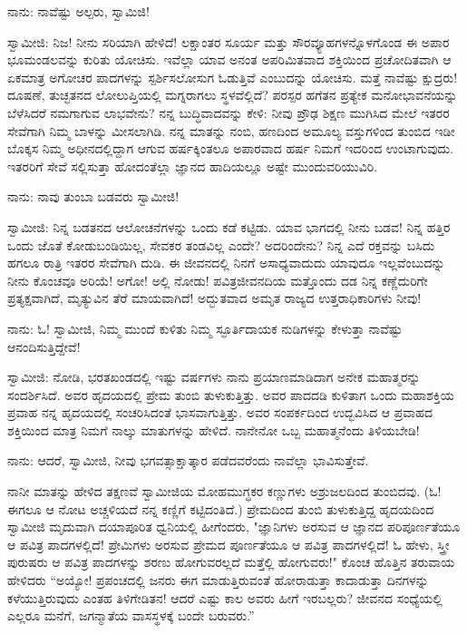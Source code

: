 ನಾನು: ನಾವೆಷ್ಟು ಅಲ್ಪರು, ಸ್ವಾಮಿಜಿ!

ಸ್ವಾಮೀಜಿ: ನಿಜ! ನೀನು ಸರಿಯಾಗಿ ಹೇಳಿದೆ! ಲಕ್ಷಾಂತರ ಸೂರ್ಯ ಮತ್ತು ಸೌರವ್ಯೂಹಗಳನ್ನೊಳಗೊಂಡ ಈ ಅಪಾರ ಭೂಮಂಡಲವನ್ನು ಕುರಿತು ಯೋಚಿಸು. ಇವೆಲ್ಲಾ ಯಾವ ಅನಂತ ಅಪರಿಮಿತವಾದ ಶಕ್ತಿಯಿಂದ ಪ್ರಚೋದಿತವಾಗಿ ಆ ಏಕಮಾತ್ರ ಅಗೋಚರ ಪಾದಗಳನ್ನು ಸ್ಪರ್ಶಿಸಲೋಸುಗ ಓಡುತ್ತಿವೆ ಎಂಬುದನ್ನು ಯೋಚಿಸು. ಮತ್ತೆ ನಾವೆಷ್ಟು ಕ್ಷುದ್ರರು! ದೂಷಣೆ, ತುಚ್ಛತನದ ಲೋಲುಪ್ತಿಯಲ್ಲಿ ಮಗ್ನರಾಗಲು ಸ್ಥಳವೆಲ್ಲಿದೆ? ಪರಸ್ಪರ ಹಗೆತನ ಪ್ರತ್ಯೇಕ ಮನೋಭಾವನೆಯನ್ನು ಬೆಳೆಸಿದರೆ ನಮಗಾಗುವ ಲಾಭವೇನು? ನನ್ನ ಬುದ್ಧಿವಾದವನ್ನು ಕೇಳಿ: ನೀವು ಪ್ರೌಢ ಶಿಕ್ಷಣ ಮುಗಿಸಿದ ಮೇಲೆ ಇತರರ ಸೇವೆಗಾಗಿ ನಿಮ್ಮ ಬಾಳನ್ನು ಮೀಸಲಾಗಿಡಿ. ನನ್ನ ಮಾತನ್ನು ನಂಬಿ, ಹಣದಿಂದ ಅಮೂಲ್ಯ ವಸ್ತುಗಳಿಂದ ತುಂಬಿದ ಇಡೀ ಬೊಕ್ಕಸ ನಿಮ್ಮ ಅಧೀನದಲ್ಲಿದ್ದಾಗ ಆಗುವ ಹರ್ಷಕ್ಕಿಂತಲೂ ಅಪಾರವಾದ ಹರ್ಷ ನಿಮಗೆ ಇದರಿಂದ ಉಂಟಾಗುವುದು. ಇತರರಿಗೆ ಸೇವೆ ಸಲ್ಲಿಸುತ್ತಾ ಹೋದಂತೆಲ್ಲಾ ಜ್ಞಾನದ ಹಾದಿಯಲ್ಲೂ ಅಷ್ಟೇ ಮುಂದುವರಿಯುವಿರಿ.

ನಾನು: ನಾವು ತುಂಬಾ ಬಡವರು ಸ್ವಾಮೀಜಿ!

ಸ್ವಾಮೀಜಿ: ನಿನ್ನ ಬಡತನದ ಆಲೋಚನೆಗಳನ್ನು ಒಂದು ಕಡೆ ಕಟ್ಟಿಡು. ಯಾವ ಭಾಗದಲ್ಲಿ ನೀನು ಬಡವ! ನಿನ್ನ ಹತ್ತಿರ ಒಂದು ಜೊತೆ ಕೋಡುಬಂಡಿಯಿಲ್ಲ, ಸೇವಕರ ತಂಡವಿಲ್ಲ ಎಂದೇ? ಅದರಿಂದೇನು? ನಿನ್ನ ಎದೆ ರಕ್ತವನ್ನು ಬಸಿದು ಹಗಲೂ ರಾತ್ರಿ ಇತರರ ಸೇವೆಗಾಗಿ ದುಡಿ. ಈ ಜೀವನದಲ್ಲಿ ನಿನಗೆ ಅಸಾಧ್ಯವಾದುದು ಯಾವುದೂ ಇಲ್ಲವೆಂಬುದನ್ನು ನೀನು ಕೊಂಚವೂ ಅರಿಯೆ! ಅಗೋ! ಅಲ್ಲಿ ನೋಡು! ಪವಿತ್ರಜೀವನದಿಯ ಮತ್ತೊಂದು ದಡ ನಿನ್ನ ಕಣ್ಣೆದುರಿಗೇ ಪ್ರತ್ಯಕ್ಷವಾಗಿದೆ, ಮೃತ್ಯುವಿನ ತೆರೆ ಮಾಯವಾಗಿದೆ! ಅದ್ಭುತವಾದ ಅಮೃತ ರಾಜ್ಯದ ಉತ್ತರಾಧಿಕಾರಿಗಳು ನೀವು!

ನಾನು: ಓ! ಸ್ವಾಮೀಜಿ, ನಿಮ್ಮ ಮುಂದೆ ಕುಳಿತು ನಿಮ್ಮ ಸ್ಫೂರ್ತಿದಾಯಕ ನುಡಿಗಳನ್ನು ಕೇಳುತ್ತಾ ನಾವೆಷ್ಟು ಆನಂದಿಸುತ್ತಿದ್ದೇವೆ!

ಸ್ವಾಮೀಜಿ: ನೋಡಿ, ಭರತಖಂಡದಲ್ಲಿ ಇಷ್ಟು ವರ್ಷಗಳು ನಾನು ಪ್ರಯಾಣಮಾಡಿದಾಗ ಅನೇಕ ಮಹಾತ್ಮರನ್ನು ಸಂದರ್ಶಿಸಿದೆ. ಅವರ ಹೃದಯದಲ್ಲಿ ಪ್ರೇಮ ತುಂಬಿ ತುಳುಕುತ್ತಿತ್ತು. ಅವರ ಪಾದದಡಿ ಕುಳಿತಾಗ ಒಂದು ಮಹಾಶಕ್ತಿಯ ಪ್ರವಾಹ ನನ್ನ ಹೃದಯದಲ್ಲಿ ಸಂಚರಿಸಿದಂತೆ ಭಾಸವಾಗುತ್ತಿತ್ತು. ಅವರ ಸಂಪರ್ಕದಿಂದ ಉದ್ಭವಿಸಿದ ಆ ಪ್ರವಾಹದ ಶಕ್ತಿಯಿಂದ ಮಾತ್ರ ನಿಮಗೆ ನಾಲ್ಕು ಮಾತುಗಳನ್ನು ಹೇಳಿದೆ. ನಾನೇನೋ ಒಬ್ಬ ಮಹಾತ್ಮನೆಂದು ತಿಳಿಯಬೇಡಿ!

ನಾನು: ಆದರೆ, ಸ್ವಾಮೀಜಿ, ನೀವು ಭಗವತ್ಸಾಕ್ಷಾತ್ಕಾರ ಪಡೆದವರೆಂದು ನಾವೆಲ್ಲಾ ಭಾವಿಸುತ್ತೇವೆ.

ನಾನೀ ಮಾತನ್ನು ಹೇಳಿದ ತಕ್ಷಣವೆ ಸ್ವಾಮೀಜಿಯ ಮೋಹಮುಗ್ಧಕರ ಕಣ್ಣುಗಳು ಅಶ್ರುಜಲದಿಂದ ತುಂಬಿದವು. (ಓ! ಈಗಲೂ ಆ ನೋಟ ಅಚ್ಚಳಿಯದೆ ನನ್ನ ಕಣ್ಣಿಗೆ ಕಟ್ಟಿದಂತಿದೆ.) ಪ್ರೇಮದಿಂದ ತುಂಬಿ ತುಳುಕುತ್ತಿದ್ದ ಹೃದಯದಿಂದ ಸ್ವಾಮೀಜಿ ಮೃದುವಾಗಿ ದಯಾಪೂರಿತ ಧ್ವನಿಯಲ್ಲಿ ಹೀಗೆಂದರು, "ಜ್ಞಾನಿಗಳು ಅರಸುವ ಆ ಜ್ಞಾನದ ಪರಿಪೂರ್ಣತೆಯೂ ಆ ಪವಿತ್ರ ಪಾದಗಳಲ್ಲಿದೆ! ಪ್ರೇಮಿಗಳು ಅರಸುವ ಪ್ರೇಮದ ಪೂರ್ಣತೆಯೂ ಆ ಪವಿತ್ರ ಪಾದಗಳಲ್ಲಿದೆ! ಓ ಹೇಳು, ಸ್ತ್ರೀ ಪುರುಷರು ಆ ಪವಿತ್ರ ಪಾದಗಳನ್ನು ಶರಣು ಹೋಗುವರಲ್ಲದೆ ಮತ್ತೆಲ್ಲಿ ಹೋಗುವರು!" ಕೊಂಚ ಹೊತ್ತಿನ ತರುವಾಯ ಹೇಳಿದರು “ಅಯ್ಯೋ! ಪ್ರಪಂಚದಲ್ಲಿ ಜನರು ಈಗ ಮಾಡುತ್ತಿರುವಂತೆ ಹೋರಾಡುತ್ತಾ ಕಾದಾಡುತ್ತಾ ದಿನಗಳನ್ನು ಕಳೆಯುತ್ತಿರುವುದು ಎಂತಹ ತಿಳಿಗೇಡಿತನ! ಆದರೆ ಎಷ್ಟು ಕಾಲ ಅವರು ಹೀಗೆ ಇರಬಲ್ಲರು? ಜೀವನದ ಸಂಧ್ಯೆಯಲ್ಲಿ ಎಲ್ಲರೂ ಮನೆಗೆ, ಜಗನ್ಮಾತೆಯ ವಾಸಸ್ಥಳಕ್ಕೆ ಬಂದೇ ಬರುವರು.”

